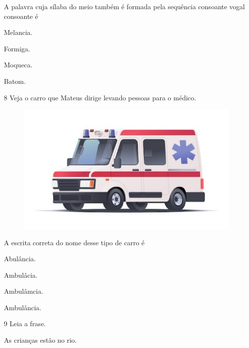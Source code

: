 
A palavra cuja sílaba do meio também é formada pela sequência consoante vogal consoante é

\begin{multicols}{2}
\begin{escolha}
\item Melancia.

\item Formiga.

\item Moqueca.

\item Batom.
\end{escolha}
\end{multicols}

\num{8} Veja o carro que Mateus dirige levando pessoas para o médico.

\begin{figure}[htpb!]
\centering
\includegraphics[width=.5\textwidth]{media/image153.jpeg}
\end{figure}


A escrita correta do nome desse tipo de carro é

\begin{escolha}
\item Abulância.

\item Ambulâcia.

\item Ambulâmcia.

\item Ambulância.
\end{escolha}

\pagebreak
\num{9} Leia a frase.

\begin{myquote}
As crianças estão no rio.
\end{myquote}

